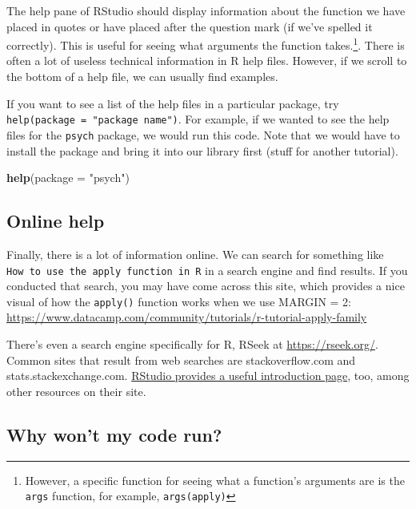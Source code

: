 \documentclass[
]{article}
\newenvironment{Shaded}{\begin{snugshade}}{\end{snugshade}}
\newcommand{\DataTypeTok}[1]{\textcolor[rgb]{0.13,0.29,0.53}{#1}}
\newcommand{\KeywordTok}[1]{\textcolor[rgb]{0.13,0.29,0.53}{\textbf{#1}}}
\newcommand{\NormalTok}[1]{#1}
\newcommand{\StringTok}[1]{\textcolor[rgb]{0.31,0.60,0.02}{#1}}
\begin{document}
The help pane of RStudio should display information about the function we have placed in quotes or have placed after the question mark (if we've spelled it correctly). This is useful for seeing what arguments the function takes.\footnote{However, a specific function for seeing what a function's arguments are is the \texttt{args} function, for example, \texttt{args(apply)}}. There is often a lot of useless technical information in R help files. However, if we scroll to the bottom of a help file, we can usually find examples.

If you want to see a list of the help files in a particular package, try \texttt{help(package\ =\ "package\ name")}. For example, if we wanted to see the help files for the \texttt{psych} package, we would run this code. Note that we would have to install the package and bring it into our library first (stuff for another tutorial).

\begin{Shaded}
\begin{Highlighting}[]
\KeywordTok{help}\NormalTok{(}\DataTypeTok{package =} \StringTok{"psych"}\NormalTok{)}
\end{Highlighting}
\end{Shaded}

\hypertarget{online-help}{%
\subsection{Online help}\label{online-help}}

Finally, there is a lot of information online. We can search for something like \texttt{How\ to\ use\ the\ apply\ function\ in\ R} in a search engine and find results. If you conducted that search, you may have come across this site, which provides a nice visual of how the \texttt{apply()} function works when we use MARGIN = 2:
\url{https://www.datacamp.com/community/tutorials/r-tutorial-apply-family}

There's even a search engine specifically for R, RSeek at \url{https://rseek.org/}. Common sites that result from web searches are stackoverflow.com and stats.stackexchange.com. \href{https://support.rstudio.com/hc/en-us/articles/201141096-Getting-Started-with-R}{RStudio provides a useful introduction page}, too, among other resources on their site.

\hypertarget{why-wont-my-code-run}{%
\subsection{Why won't my code run?}\label{why-wont-my-code-run}}
\end{document}
